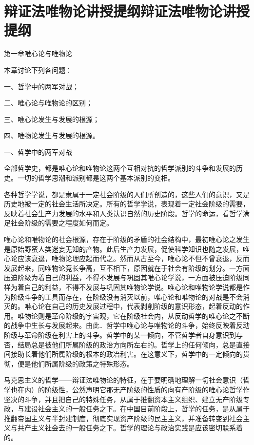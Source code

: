 \section[辩证法唯物论讲授提纲辩证法唯物论讲授提纲]{辩证法唯物论讲授提纲辩证法唯物论讲授提纲}


第一章唯心论与唯物论

本章讨论下列各问题：

一、哲学中的两军对战；

二、唯心论与唯物论的区别；

三、唯心论发生与发展的根源；

四、唯物论发生与发展的根源。

一、哲学中的两军对战

全部哲学史，都是唯心论和唯物论这两个互相对抗的哲学派别的斗争和发展的历史。一切的哲学思潮和派别都是这两个基本派别的变相。

各种哲学学说，都是隶属于一定社会阶级的人们所创造的，这些人们的意识，又是历史地被一定的社会生活所决定。所有的哲学学说，表现着一定社会阶级的需要，反映着社会生产力发展的水平和人类认识自然的历史阶段。哲学的命运，看哲学满足社会阶级的需要之程度如何而定。

唯心论和唯物论的社会根源，存在于阶级的矛盾的社会结构中，最初唯心论之发生是原始野蛮人类迷妄无知的产物。此后生产力发展，促使科学知识也随之发展，唯心论应该衰退，唯物论理应起而代之。然而从古至今，唯心论不但不曾衰退，反而发展起来，同唯物论竞长争高，互不相下，原因就在于社会有阶级的划分。一方面压迫阶级为着自己的利益，不得不发展与巩固其唯心论学说，一方面被压迫阶级同样为着自己的利益，不得不发展与巩固其唯物论学说。唯心论和唯物论学说都是作为阶级斗争的工具而存在，在阶级没有消灭以前，唯心论和唯物论的对战是不会消灭的。唯心论在自己的历史发展过程中，代表剥削阶级的意识形态，起着反动的作用。唯物论则是革命阶级的宇宙观，它在阶级社会内，从反动哲学的唯心论之不断的战争中生长与发展起来。由此．哲学中唯心论与唯物论的斗争，始终反映着反动阶级与革命阶级在利害上的斗争。哲学中的某一倾向，不管哲学者自身意识到与否，结局总是被他们所属阶级的政治方向所左右的。哲学上的任何倾向，总是直接间接助长着他们所属阶级的根本的政冶利害。在这意义下，哲学中的一定倾向的贯彻，便是他们所属阶级的政策之特殊形态。

马克思主义的哲学――辩证法唯物论的特征，在于要明确地理解一切社会意识（哲学也在内）的阶级性，公然声明它那无产阶级的性质的向有产阶级的唯心论哲学作坚决的斗争，并且把自己的特殊任务，从属于推翻资本主义组织、建立无产阶级专政，与建设社会主义的一般任务之下。在中国目前阶段上，哲学的任务，是从属于推翻帝国主义与半封建制度，彻底实现资产阶级的民主主义，并准备转变到社会主义与共产主义社会去的一般任务之下。哲学的理论与政治实践是应该密切联系着的。

